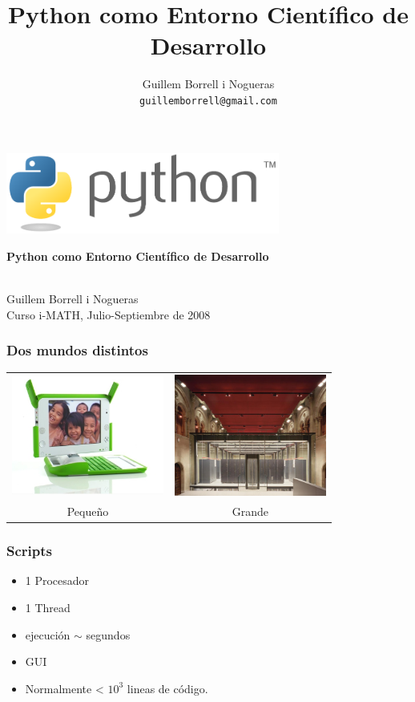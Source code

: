 \documentclass{beamer}
\title{Python como Entorno Científico de Desarrollo}
\author{
Guillem Borrell i Nogueras\\
\texttt{guillemborrell@gmail.com}
}
\begin{document}
\begin{frame}
\begin{center}
 \includegraphics[width=9cm]{files/python-logo-generic.pdf}\\
\begin{large}
\textbf{Python como Entorno Científico de Desarrollo}
\end{large}\\

Guillem Borrell i Nogueras\\

Curso i-MATH, Julio-Septiembre de 2008
\end{center}

\end{frame}


\begin{frame}
 \frametitle{Dos mundos distintos}
\begin{center}
 \begin{tabular}[h]{cc}
   \includegraphics[width=5cm]{files/nigerian-machine.jpg} &
   \includegraphics[width=5cm]{files/marenostrum.jpg}\\
   Pequeño & Grande
 \end{tabular}
\end{center}
\end{frame}

\begin{frame}
\frametitle{Scripts}
\begin{itemize}
\item 1 Procesador
\item 1 Thread
\item ejecución $\sim$ segundos
\item GUI
\item Normalmente < $10^3$ lineas de código.
\end{itemize}
\end{frame}
\end{document}
